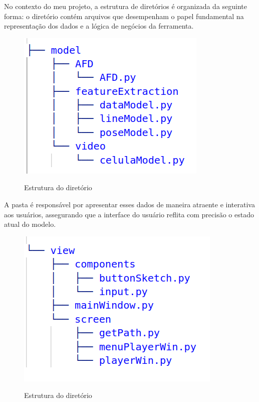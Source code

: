 No contexto do meu projeto, a estrutura de diretórios é organizada da seguinte forma: o diretório  contém arquivos que desempenham o papel fundamental na representação dos dados e a lógica de negócios da ferramenta.

\begin{figure}[H]
    \centering
    \caption{Estrutura do diretório }
    \includegraphics[scale=0.5]{figuras/diretorios/model.png}
    \label{fig:model}
\end{figure}



A pasta  é responsável por apresentar esses dados de maneira atraente e interativa aos usuários, assegurando que a interface do usuário reflita com precisão o estado atual do modelo.

\begin{figure}[H]
	\centering
	\caption{Estrutura do diretório }
	\includegraphics[scale=0.5]{figuras/diretorios/view.png}
	\label{fig:view}
\end{figure}


